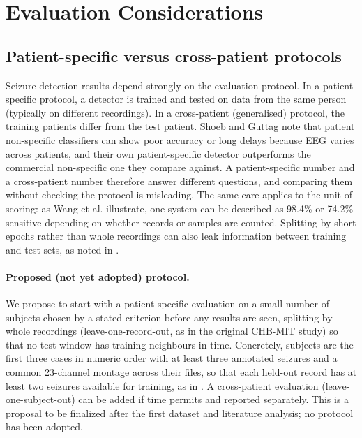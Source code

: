 \documentclass[10pt,twocolumn,letterpaper]{article}
\begin{document}
\section{Evaluation Considerations}
\label{sec:eval}

\subsection{Patient-specific versus cross-patient protocols}
\label{sec:protocol}

Seizure-detection results depend strongly on the evaluation protocol. In
a patient-specific protocol, a detector is trained and tested on data
from the same person (typically on different recordings). In a
cross-patient (generalised) protocol, the training patients differ from
the test patient. Shoeb and Guttag \cite{shoeb2010icml} note that
patient non-specific classifiers can show poor accuracy or long delays
because EEG varies across patients, and their own patient-specific
detector outperforms the commercial non-specific one they compare
against. A patient-specific number and a cross-patient number therefore
answer different questions, and comparing them without checking the
protocol is misleading. The same care applies to the unit of scoring: as
Wang et al. \cite{wang2017integrating} illustrate, one system can be
described as 98.4\% or 74.2\% sensitive depending on whether records or
samples are counted. Splitting by short epochs rather than whole
recordings can also leak information between training and test sets, as
noted in \cite{shoeb2010icml}.

\paragraph{Proposed (not yet adopted) protocol.} We propose to start
with a patient-specific evaluation on a small number of subjects chosen
by a stated criterion before any results are seen, splitting by whole
recordings (leave-one-record-out, as in the original CHB-MIT study) so
that no test window has training neighbours in time. Concretely, subjects are the first three cases in numeric order with at
least three annotated seizures and a common 23-channel montage across
their files, so that each held-out record has at least two seizures
available for training, as in \cite{shoeb2010icml}. A cross-patient
evaluation (leave-one-subject-out) can be added if time permits and
reported separately. This is a proposal to be finalized after the first
dataset and literature analysis; no protocol has been adopted.
\end{document}
